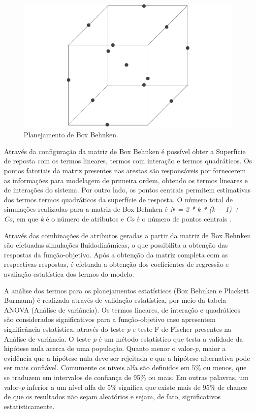\begin{figure}[H] 
    \centering  
    \includegraphics[scale=0.65]{Figuras/cubo.pdf} 
    \caption{Planejamento de Box Behnken.}  
    \label{fig:cubo}  
\end{figure}

Através da configuração da matriz de Box Behnken é possível obter a Superfície de reposta com os termos lineares, termos com interação e termos quadráticos. Os pontos fatoriais da matriz presentes nas arestas são responsáveis por fornecerem as informações para modelagem de primeira ordem, obtendo os termos lineares e de interações do sistema. Por outro lado, os pontos centrais permitem estimativas dos termos
termos quadráticos da superfície de resposta. O número total de simulações realizadas para a matriz de Box Behnken é \textit{N = 2 * k * (k $-$ 1) + Co}, em que \textit{k} é o número de atributos e \textit{Co} é o número de pontos centrais \cite{box}. 

Através das combinações de atributos geradas a partir da matriz de Box Behnken são efetuadas simulações fluidodinâmicas, o que possibilita a obtenção das respostas da função-objetivo. Após a obtenção da matriz completa com as respectivas respostas, é efetuada a obtenção dos coeficientes de regressão e avaliação estatística dos termos do modelo.

A análise dos termos para os planejamentos estatísticos (Box Behnken e Plackett Burmann) é realizada através de validação estatística, por meio da tabela ANOVA (Análise de variância). Os termos lineares, de interação e quadráticos são considerados significativos para a função-objetivo caso apresentem significância estatística, através do teste \textit{p} e teste F de Fischer presentes na Análise de variância. O teste \textit{p} é um método estatístico que testa a validade da hipótese nula acerca de uma população. Quanto menor o valor-\textit{p}, maior a evidência que a hipótese nula deve ser rejeitada e que a hipótese alternativa pode ser mais confiável. Comumente os níveis alfa são definidos em 5\% ou menos, que se traduzem em intervalos de confiança de 95\% ou mais. Em outras palavras, um valor-\textit{p} inferior a um nível alfa de 5\% significa que existe mais de 95\% de chance de que os resultados não sejam aleatórios e sejam, de fato, significativos estatisticamente. 

